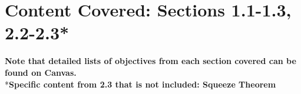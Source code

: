 \renewcommand{\myTitle}{\Course}

\renewcommand{\mySubTitle}{Test 1 Study Guide - \Qtr \Year}

\lhead{{\Large \myTitle}}
\rhead{{\LARGE \Qtr \Year}}
\lfoot{}





\section*{Content Covered: Sections 1.1-1.3, 2.2-2.3*}
\textbf{Note that detailed lists of objectives from each section covered can be found on Canvas.}\\
*\textbf{Specific content from 2.3 that is not included: Squeeze Theorem}
%
%

